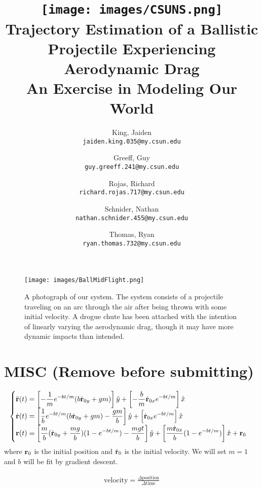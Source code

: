 \documentclass[12pt,english]{report}
\author{
	King, Jaiden\\
	\texttt{jaiden.king.035@my.csun.edu}
	\and
	Greeff, Guy\\
	\texttt{guy.greeff.241@my.csun.edu}
	\and
	Rojas, Richard\\
	\texttt{richard.rojas.717@my.csun.edu}
	\and
	Schnider, Nathan\\
	\texttt{nathan.schnider.455@my.csun.edu}
	\and
	Thomas, Ryan\\
	\texttt{ryan.thomas.732@my.csun.edu}
}
\title{\texttt{[image: images/CSUNS.png]}\\
Trajectory Estimation of a Ballistic Projectile Experiencing Aerodynamic Drag\\\large{An Exercise in Modeling Our World}}
\begin{document}
\maketitle

\tableofcontents

\begin{figure}[t]
\centering
\texttt{[image: images/BallMidFlight.png]}
\caption{\label{fig:BallMidFlight} A photograph of our system. The system consists of a projectile traveling on an arc through the air after being thrown with some initial velocity. A drogue chute has been attached with the intention of linearly varying the aerodynamic drag, though it may have more dynamic impacts than intended.}
\end{figure}











\section{MISC (Remove before submitting)}


\newpage
\begin{align*}
\begin{cases} 
\displaystyle \ddot{\bf r}(t) = \left[-\frac{1}{m}e^{-bt/m}(b\dot{\bf r}_{0y}+gm)\right]\hat{y} + \left[-\frac{b}{m}\dot{\bf r}_{0x}e^{-bt/m}\right]\hat{x} 
\\
\displaystyle \dot{\bf r}(t) = \left[\frac{1}{b}e^{-bt/m}(b\dot{\bf r}_{0y}+gm)-\frac{gm}{b}\right]\hat{y} + \left[\dot{\bf r}_{0x}e^{-bt/m}\right]\hat{x} 
\\
\displaystyle {\bf r}(t) = \left[\frac{m}{b}(\dot{\bf r}_{0y}+\frac{mg}{b})(1-e^{-bt/m})-\frac{mgt}{b}\right]\hat{y} + \left[\frac{m\dot{\bf r}_{0x}}{b}(1-e^{-bt/m})\right]\hat{x} + {\bf r}_0
\end{cases}
\end{align*}
where ${\bf r}_0$ is the initial position and $\dot{\bf r}_0$ is the initial velocity. We will set $m=1$ and $b$ will be fit by gradient descent.

\begin{align*}
\text{velocity} = \frac{\Delta \text{position}}{\Delta \text{time}}
\end{align*}
\end{document}
